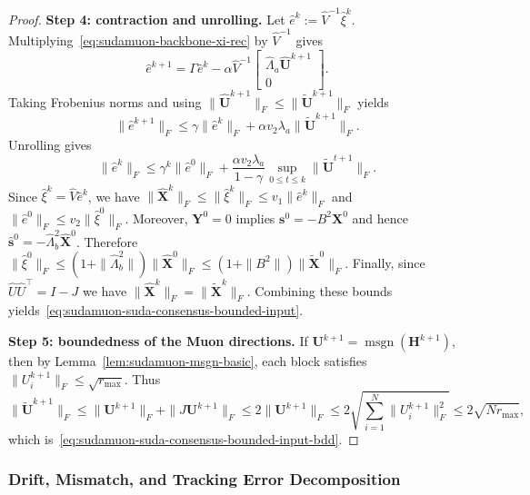 \documentclass{article}
\begin{document}
\begin{proof}
\medskip\noindent\textbf{Step 4: contraction and unrolling.}
Let $\hat e^k:=\hat V^{-1}\hat\xi^k$.
Multiplying~\eqref{eq:sudamuon-backbone-xi-rec} by $\hat V^{-1}$ gives
\[
\hat e^{k+1}=\Gamma\hat e^k-\alpha\hat V^{-1}\begin{bmatrix}\hat\Lambda_a\hat{\mathbf U}^{k+1}\\0\end{bmatrix}.
\]
Taking Frobenius norms and using $\|\hat{\mathbf U}^{k+1}\|_F\le \|\tilde{\mathbf U}^{k+1}\|_F$ yields
\[
\|\hat e^{k+1}\|_F\le \gamma\|\hat e^k\|_F+\alpha v_2\lambda_a\|\tilde{\mathbf U}^{k+1}\|_F.
\]
Unrolling gives
\[
\|\hat e^{k}\|_F\le \gamma^k\|\hat e^0\|_F+\frac{\alpha v_2\lambda_a}{1-\gamma}\sup_{0\le t\le k}\|\tilde{\mathbf U}^{t+1}\|_F.
\]
Since $\hat\xi^k=\hat V\hat e^k$, we have $\|\hat{\mathbf X}^k\|_F\le \|\hat\xi^k\|_F\le v_1\|\hat e^k\|_F$ and $\|\hat e^0\|_F\le v_2\|\hat\xi^0\|_F$.
Moreover, $\mathbf Y^0=0$ implies $\mathbf s^0=-B^2\mathbf X^0$ and hence $\hat{\mathbf s}^0=-\hat\Lambda_b^2\hat{\mathbf X}^0$.
Therefore $\|\hat\xi^0\|_F\le (1+\|\hat\Lambda_b^2\|)\|\hat{\mathbf X}^0\|_F\le (1+\|B^2\|)\|\tilde{\mathbf X}^0\|_F$.
Finally, since $\hat U\hat U^\top=I-J$ we have $\|\hat{\mathbf X}^k\|_F=\|\tilde{\mathbf X}^k\|_F$.
Combining these bounds yields~\eqref{eq:sudamuon-suda-consensus-bounded-input}.

\medskip\noindent\textbf{Step 5: boundedness of the Muon directions.}
If $\mathbf{U}^{k+1}=\operatorname{msgn}(\mathbf{H}^{k+1})$, then by Lemma~\ref{lem:sudamuon-msgn-basic}, each block satisfies $\|U_i^{k+1}\|_F\le\sqrt{r_{\max}}$.
Thus
\[
\|\tilde{\mathbf{U}}^{k+1}\|_F
\le \|\mathbf U^{k+1}\|_F+\|J\mathbf U^{k+1}\|_F
\le 2\|\mathbf U^{k+1}\|_F
\le 2\sqrt{\sum_{i=1}^N\|U_i^{k+1}\|_F^2}
\le 2\sqrt{Nr_{\max}},
\]
which is~\eqref{eq:sudamuon-suda-consensus-bounded-input-bdd}.
\end{proof}

\subsubsection*{Drift, Mismatch, and Tracking Error Decomposition}
\end{document}
